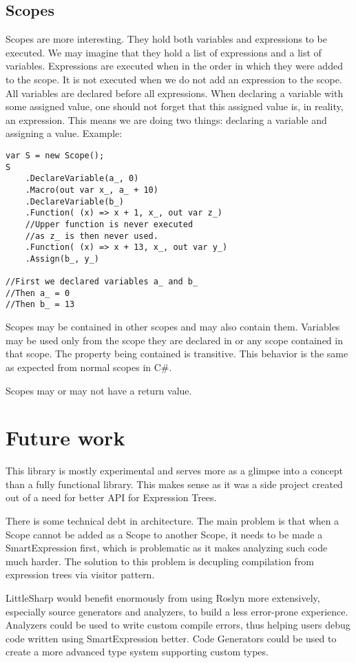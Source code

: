 \subsection{Scopes}
Scopes are more interesting. They hold both variables and expressions to be executed. We may imagine that they hold a list of expressions and a list of variables. Expressions are executed when in the order in which they were added to the scope. It is not executed when we do not add an expression to the scope. All variables are declared before all expressions. When declaring a variable with some assigned value, one should not forget that this assigned value is, in reality, an expression. This means we are doing two things: declaring a variable and assigning a value. Example: 
\begin{lstlisting}
var S = new Scope();
S
    .DeclareVariable(a_, 0)
    .Macro(out var x_, a_ + 10)
    .DeclareVariable(b_)
    .Function( (x) => x + 1, x_, out var z_)
    //Upper function is never executed
    //as z_ is then never used.
    .Function( (x) => x + 13, x_, out var y_)
    .Assign(b_, y_)

//First we declared variables a_ and b_
//Then a_ = 0
//Then b_ = 13
\end{lstlisting}

Scopes may be contained in other scopes and may also contain them. Variables may be used only from the scope they are declared in or any scope contained in that scope. The property being contained is transitive. This behavior is the same as expected from normal scopes in C\#.

Scopes may or may not have a return value. 


\section{Future work}
This library is mostly experimental and serves more as a glimpse into a concept than a fully functional library. This makes sense as it was a side project created out of a need for better API for Expression Trees. 

There is some technical debt in architecture. The main problem is that when a Scope cannot be added as a Scope to another Scope, it needs to be made a SmartExpression first, which is problematic as it makes analyzing such code much harder. The solution to this problem is decupling compilation from expression trees via visitor pattern.

LittleSharp would benefit enormously from using Roslyn more extensively, especially source generators and analyzers, to build a less error-prone experience. Analyzers could be used to write custom compile errors, thus helping users debug code written using SmartExpression better. Code Generators could be used to create a more advanced type system supporting custom types.



